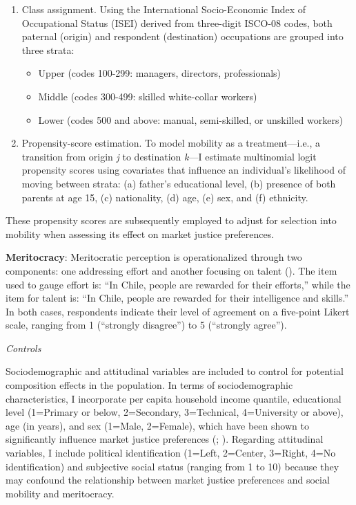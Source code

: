 \documentclass[
  12pt,
]{article}
\providecommand{\tightlist}{%
  \setlength{\itemsep}{0pt}\setlength{\parskip}{0pt}}\usepackage{longtable,booktabs,array}
\begin{document}
\begin{enumerate}
\def\labelenumi{\arabic{enumi}.}
\item
  Class assignment. Using the International Socio-Economic Index of
  Occupational Status (ISEI) derived from three-digit ISCO-08 codes,
  both paternal (origin) and respondent (destination) occupations are
  grouped into three strata:

  \begin{itemize}
  \tightlist
  \item
    Upper (codes 100-299: managers, directors, professionals)
  \item
    Middle (codes 300-499: skilled white-collar workers)
  \item
    Lower (codes 500 and above: manual, semi-skilled, or unskilled
    workers)
  \end{itemize}
\item
  Propensity-score estimation. To model mobility as a treatment---i.e.,
  a transition from origin \emph{j} to destination \emph{k}---I estimate
  multinomial logit propensity scores using covariates that influence an
  individual's likelihood of moving between strata: (a) father's
  educational level, (b) presence of both parents at age 15, (c)
  nationality, (d) age, (e) sex, and (f) ethnicity.
\end{enumerate}

These propensity scores are subsequently employed to adjust for
selection into mobility when assessing its effect on market justice
preferences.

\textbf{Meritocracy}: Meritocratic perception is operationalized through
two components: one addressing effort and another focusing on talent
(). The item used to gauge
effort is: ``In Chile, people are rewarded for their efforts,'' while
the item for talent is: ``In Chile, people are rewarded for their
intelligence and skills.'' In both cases, respondents indicate their
level of agreement on a five-point Likert scale, ranging from 1
(``strongly disagree'') to 5 (``strongly agree'').

\emph{Controls}

Sociodemographic and attitudinal variables are included to control for
potential composition effects in the population. In terms of
sociodemographic characteristics, I incorporate per capita household
income quantile, educational level (1=Primary or below, 2=Secondary,
3=Technical, 4=University or above), age (in years), and sex (1=Male,
2=Female), which have been shown to significantly influence market
justice preferences (; ). Regarding
attitudinal variables, I include political identification (1=Left,
2=Center, 3=Right, 4=No identification) and subjective social status
(ranging from 1 to 10) because they may confound the relationship
between market justice preferences and social mobility and meritocracy.
\end{document}
